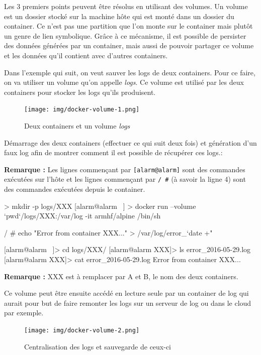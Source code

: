 \documentclass[11pt,a4paper,oneside]{report}
\newcommand{\code}[1]{\texttt{#1}}
\begin{document}
Les 3 premiers points peuvent être résolus en utilisant des volumes. Un volume est un dossier stocké sur la machine hôte qui est monté dans un dossier du container. Ce n'est pas une partition que l'on monte sur le container mais plutôt un genre de lien symbolique. Grâce à ce mécanisme, il est possible de persister des données générées par un container, mais aussi de pouvoir partager ce volume et les données qu'il contient avec d'autres containers.

Dans l'exemple qui suit, on veut sauver les logs de deux containers. Pour ce faire, on va utiliser un volume qu'on appelle \textit{logs}. Ce volume est utilisé par les deux containers pour stocker les logs qu'ils produisent.

\begin{figure}[H]
\centering
\texttt{[image: img/docker-volume-1.png]}
\caption{Deux containers et un volume \textit{logs}}
\end{figure}

Démarrage des deux containers (effectuer ce qui suit deux fois) et génération d'un faux log afin de montrer comment il est possible de récupérer ces logs.:

\textbf{Remarque :} Les lignes commençant par \code{[alarm@alarm]} sont des commandes exécutées sur l'hôte et les lignes commençant par \code{/ \#} (à savoir la ligne 4) sont des commandes exécutées depuis le container.

\begin{bashcode}
 > mkdir -p logs/XXX
[alarm@alarm ~] > docker run --volume `pwd`/logs/XXX:/var/log -it armhf/alpine /bin/sh

/ # echo "Error from container XXX..." > /var/log/error_`date +"%

[alarm@alarm ~]> cd logs/XXX/
[alarm@alarm XXX]> ls
error_2016-05-29.log
[alarm@alarm XXX]> cat error_2016-05-29.log
Error from container XXX...
\end{bashcode}

\textbf{Remarque :} XXX est à remplacer par A et B, le nom des deux containers.

Ce volume peut être ensuite accédé en lecture seule par un container de log qui aurait pour but de faire remonter les logs sur un serveur de log ou dans le cloud par exemple.

\begin{figure}[H]
\centering
\texttt{[image: img/docker-volume-2.png]}
\caption{Centralisation des logs et sauvegarde de ceux-ci}
\end{figure}
\end{document}
